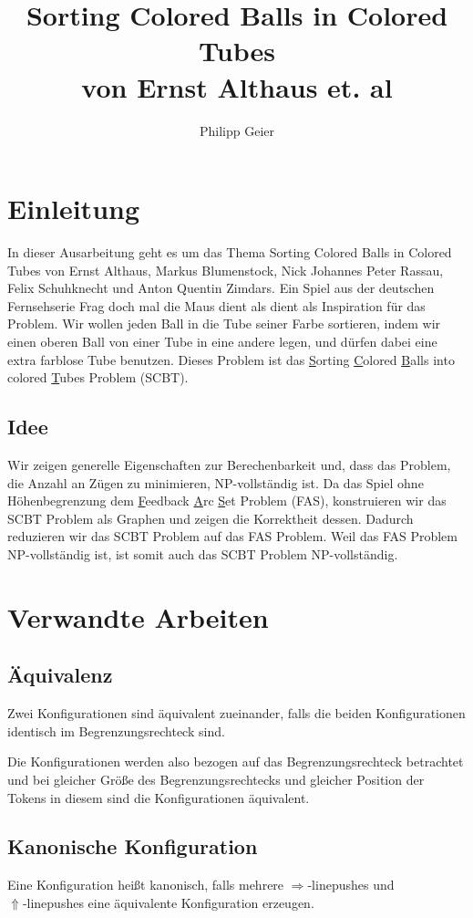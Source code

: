 \documentclass[seminar,german]{algothesis}
\title{Sorting Colored Balls in Colored Tubes \\ von Ernst Althaus et. al} %
\author{Philipp Geier} %
\begin{document}
\setcounter{page}{1}
\section{Einleitung}
In dieser Ausarbeitung geht es um das Thema \glqq Sorting Colored Balls in Colored Tubes\grqq{} von Ernst Althaus, Markus Blumenstock, Nick Johannes Peter Rassau, Felix Schuhknecht und Anton Quentin Zimdars. Ein Spiel aus der deutschen Fernsehserie \glqq Frag doch mal die Maus\grqq{} dient als dient als Inspiration für das Problem. Wir wollen jeden Ball in die Tube seiner Farbe sortieren, indem wir einen oberen Ball von einer Tube in eine andere legen, und dürfen dabei eine extra farblose Tube benutzen. Dieses Problem ist das \underline{S}orting \underline{C}olored \underline{B}alls into colored \underline{T}ubes Problem (SCBT).

\subsection{Idee}
Wir zeigen generelle Eigenschaften zur Berechenbarkeit und, dass das Problem, die Anzahl an Zügen zu minimieren, NP-vollständig ist. Da das Spiel ohne Höhenbegrenzung dem \underline{F}eedback \underline{A}rc \underline{S}et Problem (FAS), konstruieren wir das SCBT Problem als Graphen und zeigen die Korrektheit dessen. Dadurch reduzieren wir das SCBT Problem auf das FAS Problem. Weil das FAS Problem NP-vollständig ist, ist somit auch das SCBT Problem NP-vollständig.

\section{Verwandte Arbeiten}

\subsection{Äquivalenz}
\begin{definition}
Zwei Konfigurationen sind äquivalent zueinander, falls die beiden Konfigurationen identisch im Begrenzungsrechteck sind. 
\end{definition}
\noindent Die Konfigurationen werden also bezogen auf das Begrenzungsrechteck betrachtet und bei gleicher Größe des Begrenzungsrechtecks und gleicher Position der Tokens in diesem sind die Konfigurationen äquivalent.


\subsection{Kanonische Konfiguration}
\begin{definition}
Eine Konfiguration heißt kanonisch, falls mehrere $\Rightarrow$-linepushes und \\$\Uparrow$-linepushes eine äquivalente Konfiguration erzeugen.
\end{definition}
\end{document}
